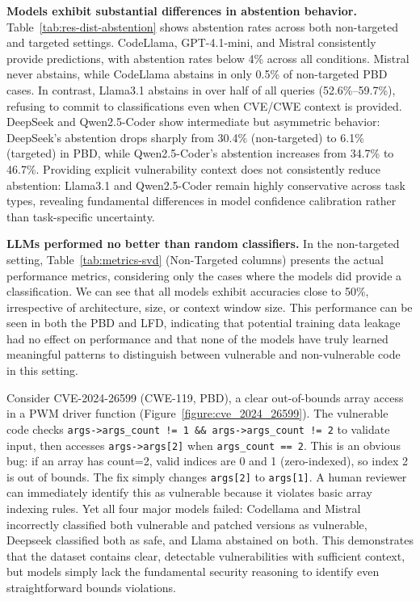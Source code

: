 \documentclass[lettersize,journal]{IEEEtran}
\begin{document}
\textbf{Models exhibit substantial differences in abstention behavior.} Table~\ref{tab:res-dist-abstention} shows abstention rates across both non-targeted and targeted settings. CodeLlama, GPT-4.1-mini, and Mistral consistently provide predictions, with abstention rates below 4\% across all conditions. Mistral never abstains, while CodeLlama abstains in only 0.5\% of non-targeted PBD cases. In contrast, Llama3.1 abstains in over half of all queries (52.6\%–59.7\%), refusing to commit to classifications even when CVE/CWE context is provided. DeepSeek and Qwen2.5-Coder show intermediate but asymmetric behavior: DeepSeek's abstention drops sharply from 30.4\% (non-targeted) to 6.1\% (targeted) in PBD, while Qwen2.5-Coder's abstention increases from 34.7\% to 46.7\%. Providing explicit vulnerability context does not consistently reduce abstention: Llama3.1 and Qwen2.5-Coder remain highly conservative across task types, revealing fundamental differences in model confidence calibration rather than task-specific uncertainty.

\textbf{\glspl{LLM} performed no better than random classifiers.} In the non-targeted setting, Table~\ref{tab:metrics-svd} (Non-Targeted columns) presents the actual performance metrics, considering only the cases where the models did provide a classification. We can see that all models exhibit accuracies close to 50\%, irrespective of architecture, size, or context window size. This performance can be seen in both the \gls{PBD} and \gls{LFD}, indicating that potential training data leakage had no effect on performance and that none of the models have truly learned meaningful patterns to distinguish between vulnerable and non-vulnerable code in this setting.


Consider CVE-2024-26599 (CWE-119, PBD), a clear out-of-bounds array access in a PWM driver function (Figure~\ref{figure:cve_2024_26599}). The vulnerable code checks \texttt{args->args\_count != 1 \&\& args->args\_count != 2} to validate input, then accesses \texttt{args->args[2]} when \texttt{args\_count == 2}. This is an obvious bug: if an array has count=2, valid indices are 0 and 1 (zero-indexed), so index 2 is out of bounds. The fix simply changes \texttt{args[2]} to \texttt{args[1]}. A human reviewer can immediately identify this as vulnerable because it violates basic array indexing rules. Yet all four major models failed: Codellama and Mistral incorrectly classified both vulnerable and patched versions as vulnerable, Deepseek classified both as safe, and Llama abstained on both. This demonstrates that the dataset contains clear, detectable vulnerabilities with sufficient context, but models simply lack the fundamental security reasoning to identify even straightforward bounds violations.
\end{document}
